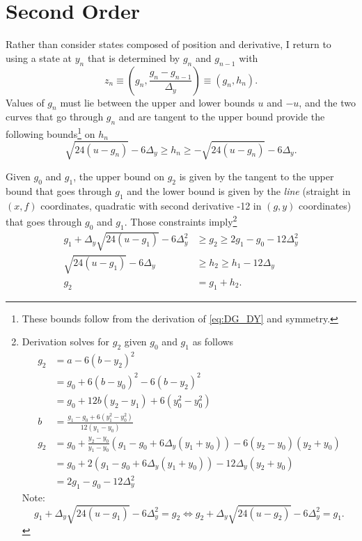\documentclass[]{article}
\begin{document}
\section{Second Order}
\label{sec:second-order}

Rather than consider states composed of position and derivative, I
return to using a state at $y_n$ that is determined by $g_n$ and
$g_{n-1}$ with
\begin{equation*}
  z_n \equiv \left(g_n, \frac{g_n - g_{n-1}}{\Delta_y} \right) \equiv
  (g_n, h_n).
\end{equation*}
Values of $g_n$ must lie between the upper and lower bounds $u$ and
$-u$, and the two curves that go through $g_n$ and are tangent to the
upper bound provide the following bounds\footnote{These bounds follow
  from the derivation of \eqref{eq:DG_DY} and symmetry.} on $h_n$
\begin{equation*}
  \sqrt{24(u - g_n)} - 6 \Delta_y \geq h_n \geq - \sqrt{24(u - g_n)} -
  6 \Delta_y.
\end{equation*}

Given $g_0$ and $g_1$, the upper bound on $g_2$ is given by the
tangent to the upper bound that goes through $g_1$ and the lower bound
is given by the \emph{line} (straight in $(x,f)$ coordinates,
quadratic with second derivative -12 in $(g,y)$ coordinates) that goes
through $g_0$ and $g_1$.  Those constraints imply\footnote{Derivation
  solves for $g_2$ given $g_0$ and $g_1$ as follows
  \begin{align*}
    g_2 &= a - 6(b-y_2)^2 \\
    &= g_0 + 6(b-y_0)^2 - 6(b-y_2)^2 \\
    &= g_0 + 12b(y_2 - y_1) + 6(y_0^2 - y_0^2) \\
    b &= \frac{ g_1 - g_0 + 6(y_1^2 - y_0^2)}{12(y_1 - y_0)} \\
    g_2 &= g_0 + \frac{y_2 - y_0}{y_1-y_0} \left( g_1 - g_0 + 6
      \Delta_y (y_1 + y_0) \right) - 6 (y_2 - y_0)(y_2 + y_0) \\
    &= g_0 + 2 \left( g_1 - g_0 + 6
      \Delta_y (y_1 + y_0) \right) - 12\Delta_y (y_2 + y_0) \\
    &= 2g_1 - g_0 - 12 \Delta_y^2
  \end{align*}
  Note:
  \begin{equation*}
    g_1 + \Delta_y \sqrt{24(u - g_1)} - 6 \Delta^2_y = g_2 \iff
    g_2 + \Delta_y \sqrt{24(u - g_2)} - 6 \Delta^2_y = g_1 .
  \end{equation*}
}
\begin{subequations}
  \label{eq:bounds}
  \begin{align}
     g_1 + \Delta_y \sqrt{24(u - g_1)} - 6 \Delta^2_y &\geq g_2 \geq
     2g_1 - g_0 - 12 \Delta_y^2 \\
     \sqrt{24(u - g_1)}  - 6 \Delta_y &\geq h_2 \geq h_1 - 12 \Delta_y
     \\
    g_2 &= g_1 + h_2.
  \end{align}
\end{subequations}
\end{document}
